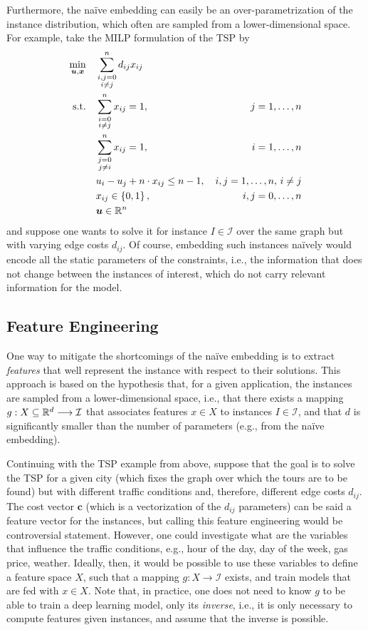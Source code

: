 Furthermore, the naïve embedding can easily be an over-parametrization of the instance distribution, which often are sampled from a lower-dimensional space.
For example, take the MILP formulation of the TSP by 
\begin{align*}
    \min_{\bm{u},\bm{x}} \quad & \sum_{\substack{i,j=0 \\ i\neq j}}^{n} d_{ij} x_{ij} & \\
    \textrm{s.t.} \quad & \sum_{\substack{i=0\\i\neq j}}^{n} x_{ij} = 1, &\, j=1,\ldots,n \\
			& \sum_{\substack{j=0\\j\neq i}}^{n} x_{ij} = 1, &\, i=1,\ldots,n \\
			& u_i - u_j + n \cdot x_{ij} \le n - 1, &\, i,j=1,\ldots,n,\, i\neq j\\
			& x_{ij} \in \left\{ 0,1 \right\}, &\, i,j=0,\ldots,n  \\
			& \bm{u} \in \mathbb{R}^{n} &
\end{align*}
and suppose one wants to solve it for instance $I\in \mathcal{I}$ over the same graph but with varying edge costs $d_{ij}$.
Of course, embedding such instances naïvely would encode all the static parameters of the constraints, i.e., the information that does not change between the instances of interest, which do not carry relevant information for the model.


\subsection{Feature Engineering}

One way to mitigate the shortcomings of the naïve embedding is to extract \emph{features} that well represent the instance with respect to their solutions.
This approach is based on the hypothesis that, for a given application, the instances are sampled from a lower-dimensional space, i.e., that there exists a mapping $g: X\subseteq\mathbb{R}^{d} \longrightarrow \mathcal{I}$ that associates features $x\in X$ to instances $I\in \mathcal{I}$, and that $d$ is significantly smaller than the number of parameters (e.g., from the naïve embedding).

Continuing with the TSP example from above, suppose that the goal is to solve the TSP for a given city (which fixes the graph over which the tours are to be found) but with different traffic conditions and, therefore, different edge costs $d_{ij}$.
The cost vector $\bm{c}$ (which is a vectorization of the $d_{ij}$ parameters) can be said a feature vector for the instances, but calling this feature engineering would be controversial statement.
However, one could investigate what are the variables that influence the traffic conditions, e.g., hour of the day, day of the week, gas price, weather.
Ideally, then, it would be possible to use these variables to define a feature space $X$, such that a mapping $g: X \longrightarrow \mathcal{I}$ exists, and train models that are fed with $x\in X$.
Note that, in practice, one does not need to know $g$ to be able to train a deep learning model, only its \emph{inverse}, i.e., it is only necessary to compute features given instances, and assume that the inverse is possible.

